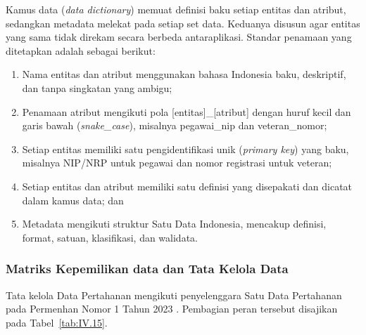 Kamus data (\textit{data dictionary}) memuat definisi baku setiap entitas dan atribut, sedangkan metadata melekat pada setiap set data. Keduanya disusun agar entitas yang sama tidak direkam secara berbeda antaraplikasi. Standar penamaan yang ditetapkan adalah sebagai berikut:
\begin{enumerate}[label=\arabic*.]
\item Nama entitas dan atribut menggunakan bahasa Indonesia baku, deskriptif, dan tanpa singkatan yang ambigu;
\item Penamaan atribut mengikuti pola [entitas]\_[atribut] dengan huruf kecil dan garis bawah (\textit{snake\_case}), misalnya pegawai\_nip dan veteran\_nomor;
\item Setiap entitas memiliki satu pengidentifikasi unik (\textit{primary key}) yang baku, misalnya NIP/NRP untuk pegawai dan nomor registrasi untuk veteran;
\item Setiap entitas dan atribut memiliki satu definisi yang disepakati dan dicatat dalam kamus data; dan
\item Metadata mengikuti struktur Satu Data Indonesia, mencakup definisi, format, satuan, klasifikasi, dan walidata.
\end{enumerate}

\subsubsection{Matriks Kepemilikan data dan Tata Kelola Data}
\label{sec:IV.4.1.5}

Tata kelola Data Pertahanan mengikuti penyelenggara Satu Data Pertahanan pada Permenhan Nomor 1 Tahun 2023 \cite{Permenhan1Tahun2023}. Pembagian peran tersebut disajikan pada Tabel~\ref{tab:IV.15}.

